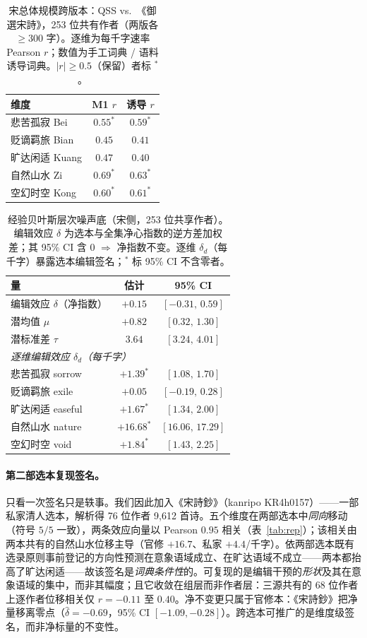 \documentclass[11pt]{article}
\begin{document}
\begin{table}[H]
\centering\small
\caption{宋总体规模跨版本：QSS vs.\ 《御選宋詩》，253 位共有作者（两版各 $\ge$300 字）。逐维为每千字速率 Pearson $r$；数值为手工词典 / 语料诱导词典。$|r|{\ge}0.5$（保留）者标 $^*$。}
\label{tab:songpop}
\begin{tabular}{lcc}
\toprule
维度 & M1 $r$ & 诱导 $r$\\
\midrule
悲苦孤寂 Bei & $0.55^*$ & $0.59^*$\\
贬谪羁旅 Bian & $0.45$ & $0.41$\\
旷达闲适 Kuang & $0.47$ & $0.40$\\
自然山水 Zi & $0.69^*$ & $0.63^*$\\
空幻时空 Kong & $0.60^*$ & $0.61^*$\\
\bottomrule
\end{tabular}
\end{table}
\begin{table}[H]
\centering\small
\caption{经验贝叶斯层次噪声底（宋侧，253 位共享作者）。编辑效应 $\delta$ 为选本与全集净心指数的逆方差加权差；其 95\% CI 含 $0$ $\Rightarrow$ 净指数不变。逐维 $\delta_d$（每千字）暴露选本编辑签名；$^*$ 标 95\% CI 不含零者。}
\label{tab:hb}
\begin{tabular}{lcc}
\toprule
量 & 估计 & 95\% CI\\
\midrule
编辑效应 $\delta$（净指数） & $+0.15$ & $[-0.31,\,0.59]$\\
潜均值 $\mu$ & $+0.82$ & $[0.32,\,1.30]$\\
潜标准差 $\tau$ & $3.64$ & $[3.24,\,4.01]$\\
\midrule
\multicolumn{3}{l}{\emph{逐维编辑效应 $\delta_d$（每千字）}}\\
悲苦孤寂 sorrow & $+1.39^*$ & $[1.08,\,1.70]$\\
贬谪羁旅 exile & $+0.05$ & $[-0.19,\,0.28]$\\
旷达闲适 easeful & $+1.67^*$ & $[1.34,\,2.00]$\\
自然山水 nature & $+16.68^*$ & $[16.06,\,17.29]$\\
空幻时空 void & $+1.84^*$ & $[1.43,\,2.25]$\\
\bottomrule
\end{tabular}
\end{table}

\paragraph{第二部选本复现签名。}只看一次签名只是轶事。我们因此加入《宋詩鈔》（kanripo KR4h0157）——一部私家清人选本，解析得 76 位作者 9{,}612 首诗。五个维度在两部选本中\emph{同向}移动（符号 $5/5$ 一致），两条效应向量以 Pearson $0.95$ 相关（表~\ref{tab:rep}）；该相关由两本共有的自然山水位移主导（官修 $+16.7$、私家 $+4.4$/千字）。依两部选本既有选录原则事前登记的方向性预测在意象语域成立、在旷达语域不成立——两本都抬高了旷达闲适——故该签名是\emph{词典条件性}的。可复现的是编辑干预的\emph{形状}及其在意象语域的集中，而非其幅度；且它收敛在组层而非作者层：三源共有的 68 位作者上逐作者位移相关仅 $r{=}-0.11$ 至 $0.40$。净不变更只属于官修本：《宋詩鈔》把净量移离零点（$\hat\delta{=}-0.69$，95\% CI $[-1.09,-0.28]$）。跨选本可推广的是维度级签名，而非净标量的不变性。
\end{document}
